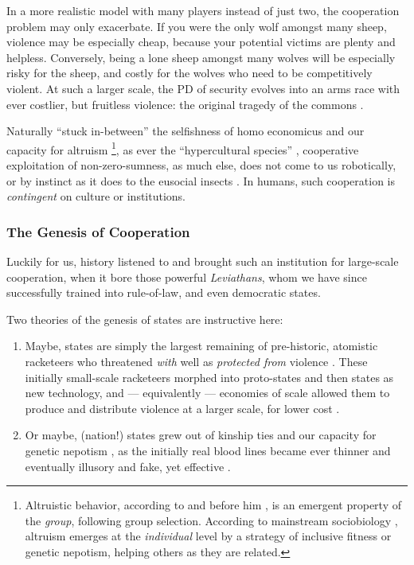 In a more realistic model with many players instead of just two, the cooperation problem may only exacerbate. 
If you were the only wolf amongst many sheep, violence may be especially cheap, because your potential victims are plenty and helpless. 
Conversely, being a lone sheep amongst many wolves will be especially risky for the sheep, and costly for the wolves who need to be competitively violent. 
At such a larger scale, the \gls{PD} of security evolves into an arms race with ever costlier, but fruitless violence: the original tragedy of the commons \citep{Hardin-1968-aa}.

Naturally ``stuck in-between'' \citep{Lehrer2012} the selfishness of homo economicus and our capacity for altruism
\footnote{
	Altruistic behavior, according to \cite{Wilson2012} and before him \cite{Darwin1859}, is an emergent property of the \emph{group}, following group selection. 
	According to mainstream sociobiology \citep[and initially][]{Wilson1975}, altruism emerges at the \emph{individual} level by a strategy of inclusive fitness or genetic nepotism, helping others as they are related.
},
as ever the ``hypercultural species'' \citep[K175]{Henrich2007}, cooperative exploitation of non-zero-sumness, as much else, does not come to us robotically, or by instinct as it does to the eusocial insects \citep{Wilson2012}. 
In humans, such cooperation is \emph{contingent} on culture or institutions.

\subsubsection{The Genesis of Cooperation}
Luckily for us, history listened to \citeauthor{Hobbes-1651-aa} and brought such an institution for large-scale cooperation, when it bore those powerful \emph{Leviathans}, whom we have since successfully trained into rule-of-law, and even democratic states. 

Two theories of the genesis of states are instructive here:
\begin{enumerate}
	\item 
		Maybe, states are simply the largest remaining of pre-historic, atomistic racketeers who threatened \emph{with} well as \emph{protected from} violence \citep[182]{Tilly-1985-aa}. 
		These initially small-scale racketeers morphed into proto-states and then states as new technology, and --- equivalently --- economies of scale allowed them to produce and distribute violence at a larger scale, for lower cost \citep{Tilly-1985-aa}.
	\item 
		Or maybe, (nation!) states grew out of kinship ties and our capacity for genetic nepotism \citep{Hamilton1964,Axelrod1981a}, as the initially real blood lines became ever thinner and eventually illusory and fake, yet effective \citep{Van-den-Berghe-1981-aa,Gellner-1983-aa}. 
\end{enumerate}

